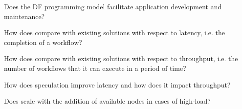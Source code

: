\begin{description}[labelindent=0cm]
    \item[Q1] Does the DF programming model facilitate application development and maintenance?\str
    \item[Q2] How does \sys compare with existing solutions with respect to latency, i.e. the completion of a workflow?
    \item[Q3] How does \sys compare with existing solutions with respect to throughput, i.e. the number of workflows that it can execute in a period of time?
    \item[Q4] How does speculation improve latency and how does it impact throughput? 
    \item[Q5] Does \sys scale with the addition of available nodes in cases of high-load?
\end{description}
%



